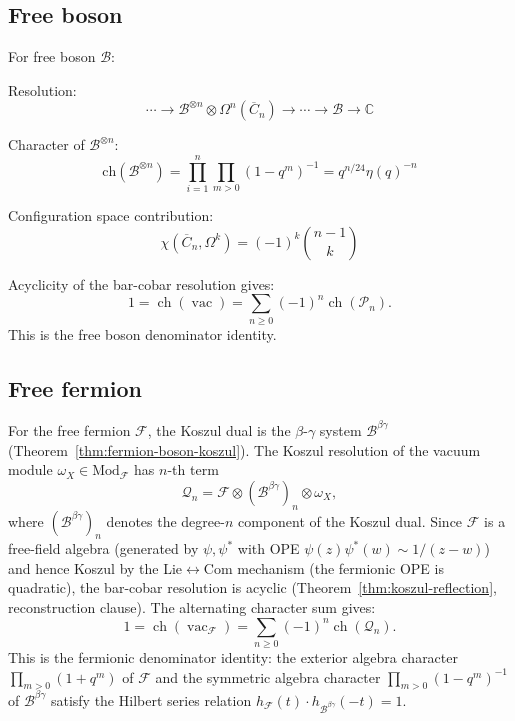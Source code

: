 \subsection{Free boson}

\begin{calculation}
For free boson $\mathcal{B}$:

Resolution:
\[
\cdots \to \mathcal{B}^{\otimes n} \otimes \Omega^n(\overline{C}_n) \to \cdots \to \mathcal{B} \to \mathbb{C}
\]

Character of $\mathcal{B}^{\otimes n}$:
\[
\text{ch}(\mathcal{B}^{\otimes n}) = \prod_{i=1}^n \prod_{m > 0} (1 - q^m)^{-1} = q^{n/24}\eta(q)^{-n}
\]

Configuration space contribution:
\[
\chi(\overline{C}_n, \Omega^k) = (-1)^k \binom{n-1}{k}
\]

Acyclicity of the bar-cobar resolution gives:
\[
1 = \operatorname{ch}(\operatorname{vac}) = \sum_{n \geq 0} (-1)^n \operatorname{ch}(\mathcal{P}_n).
\]
This is the free boson denominator identity.
\end{calculation}

\subsection{Free fermion}

\begin{calculation}
For the free fermion $\mathcal{F}$, the Koszul dual is the
$\beta$-$\gamma$ system $\mathcal{B}^{\beta\gamma}$
(Theorem~\ref{thm:fermion-boson-koszul}).
The Koszul resolution of the vacuum module
$\omega_X \in \mathrm{Mod}_{\mathcal{F}}$ has $n$-th term
\[
\mathcal{Q}_n
= \mathcal{F} \otimes (\mathcal{B}^{\beta\gamma})_n \otimes \omega_X,
\]
where $(\mathcal{B}^{\beta\gamma})_n$ denotes the degree-$n$ component
of the Koszul dual. Since $\mathcal{F}$ is a free-field algebra
(generated by $\psi, \psi^*$ with OPE
$\psi(z)\psi^*(w) \sim 1/(z-w)$) and hence Koszul by the
Lie$\leftrightarrow$Com mechanism
(the fermionic OPE is quadratic), the bar-cobar resolution is acyclic
(Theorem~\ref{thm:koszul-reflection}, reconstruction clause). The alternating character
sum gives:
\[
1 = \operatorname{ch}(\operatorname{vac}_{\mathcal{F}})
= \sum_{n \geq 0} (-1)^n \operatorname{ch}(\mathcal{Q}_n).
\]
This is the fermionic denominator identity: the exterior algebra
character $\prod_{m > 0}(1 + q^m)$ of $\mathcal{F}$ and the symmetric
algebra character $\prod_{m > 0}(1 - q^m)^{-1}$ of $\mathcal{B}^{\beta\gamma}$
satisfy the Hilbert series relation
$h_{\mathcal{F}}(t) \cdot h_{\mathcal{B}^{\beta\gamma}}(-t) = 1$.
\end{calculation}

